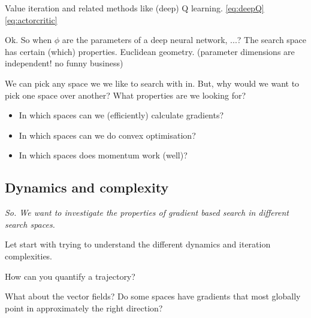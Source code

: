 Value iteration and related methods like (deep) Q learning. \eqref{eq:deepQ}
\eqref{eq:actorcritic}

Ok. So when $\phi$ are the parameters of a deep neural network, ...? The search space has certain (which) properties.
Euclidean geometry.
(parameter dimensions are independent! no funny business)

We can pick any space we we like to search with in. But, why would we want to pick one space over another?
What properties are we looking for?

\begin{itemize}
\tightlist
\item
  In which spaces can we (efficiently) calculate gradients?
\item
  In which spaces can we do convex optimisation?
\item
  In which spaces does momentum work (well)?
\end{itemize}


\subsection{Dynamics and complexity}

\begin{displayquote}
  \textit{So. We want to investigate the properties of gradient based search in different search spaces.}
\end{displayquote}

Let start with trying to understand the different dynamics and iteration complexities.

How can you quantify a trajectory?

What about the vector fields?
Do some spaces have gradients that most globally point in approximately the right direction?



